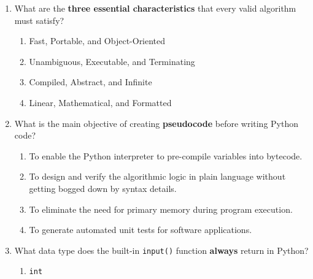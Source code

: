 \documentclass[11pt,a4paper]{article}
\begin{document}
\begin{enumerate}[label=\textbf{Q\arabic*.},leftmargin=2em,itemsep=2pt,topsep=1pt]
\begin{enumerate}[label=\Alph*.,noitemsep,topsep=0.5pt,leftmargin=2em]
  \end{enumerate}

  \newpage

  \item What are the \textbf{three essential characteristics} that every valid algorithm must satisfy?

  \begin{enumerate}[label=\Alph*.,noitemsep,topsep=0.5pt,leftmargin=2em]

    \item Fast, Portable, and Object-Oriented

    \item Unambiguous, Executable, and Terminating

    \item Compiled, Abstract, and Infinite

    \item Linear, Mathematical, and Formatted

  \end{enumerate}

  \item What is the main objective of creating \textbf{pseudocode} before writing Python code?

  \begin{enumerate}[label=\Alph*.,noitemsep,topsep=0.5pt,leftmargin=2em]

    \item To enable the Python interpreter to pre-compile variables into bytecode.

    \item To design and verify the algorithmic logic in plain language without getting bogged down by syntax details.

    \item To eliminate the need for primary memory during program execution.

    \item To generate automated unit tests for software applications.

  \end{enumerate}

  \item What data type does the built-in \texttt{input()} function \textbf{always} return in Python?

  \begin{enumerate}[label=\Alph*.,noitemsep,topsep=0.5pt,leftmargin=2em]

    \item \texttt{int}


\end{enumerate}
\end{enumerate}
\end{document}
